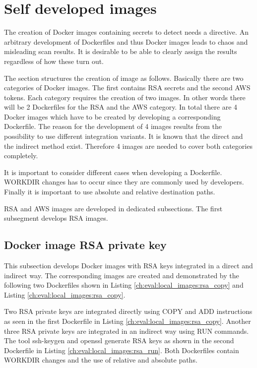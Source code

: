 \section{Self developed images}
\label{ch:eval:local_images}
The creation of Docker images containing secrets to detect needs a directive. 
An arbitrary development of Dockerfiles and thus Docker images leads to chaos and misleading scan results. 
It is desirable to be able to clearly assign the results regardless of how these turn out.

The section structures the creation of image as follows. 
Basically there are two categories of Docker images. 
The first contains RSA secrets and the second AWS tokens. 
Each category requires the creation of two images. 
In other words there will be 2 Dockerfiles for the RSA and the AWS category. 
In total there are 4 Docker images which have to be created by developing a corresponding Dockerfile. 
The reason for the development of 4 images results from the possibility to use different integration variants.
It is known that the direct and the indirect method exist. 
Therefore 4 images are needed to cover both categories completely.

It is important to consider different cases when developing a Dockerfile. 
WORKDIR changes has to occur since they are commonly used by developers. 
Finally it is important to use absolute and relative destination paths. 

RSA and AWS images are developed in dedicated subsections. 
The first subsegment develops RSA images.

\subsection{Docker image RSA private key}
\label{ch:eval:local_images:rsa}
This subsection develops Docker images with RSA keys integrated in a direct and indirect way. 
The corresponding images are created and demonstrated by the following two Dockerfiles shown in Listing \ref{ch:eval:local_images:rsa_copy} and Listing \ref{ch:eval:local_images:rsa_copy}.


Two RSA private keys are integrated directly using COPY and ADD instructions as seen in the first Dockerfile in Listing \ref{ch:eval:local_images:rsa_copy}. 
Another three RSA private keys are integrated in an indirect way using RUN commands. 
The tool ssh-keygen and openssl generate RSA keys as shown in the second Dockerfile in Listing \ref{ch:eval:local_images:rsa_run}. 
Both Dockerfiles contain WORKDIR changes and the use of relative and absolute paths. 

